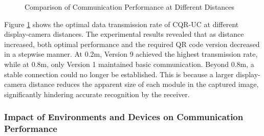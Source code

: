 \documentclass[preprint,12pt]{elsarticle}
\begin{document}
\begin{figure}[!ht]
    \caption{Comparison of Communication Performance at Different Distances}
    \label{fig:distances}
\end{figure}

Figure \ref{fig:distances} shows the optimal data transmission rate of CQR-UC at different display-camera distances. The experimental results revealed that as distance increased, both optimal performance and the required QR code version decreased in a stepwise manner. At 0.2m, Version 9 achieved the highest transmission rate, while at 0.8m, only Version 1 maintained basic communication. Beyond 0.8m, a stable connection could no longer be established. This is because a larger display-camera distance reduces the apparent size of each module in the captured image, significantly hindering accurate recognition by the receiver.




\subsubsection{Impact of Environments and Devices on Communication Performance}
\end{document}
